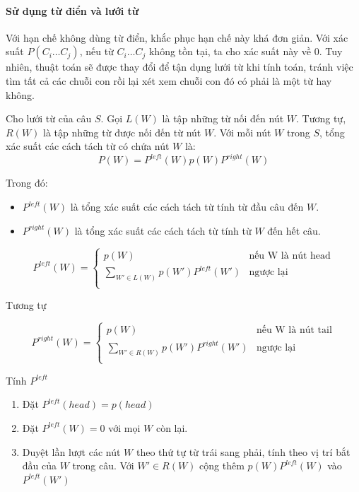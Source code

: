 \documentclass[a4paper,oneside,14pt]{extbook} %
\begin{document}
\paragraph{Sử dụng từ điển và lưới từ}

Với hạn chế không dùng từ điển, khắc phục hạn chế này khá đơn
giản. Với xác suất $P(C_i\ldots C_j)$, nếu từ $C_i\ldots C_j$ không
tồn tại, ta cho xác suất này về $0$. Tuy nhiên, thuật toán sẽ được
thay đổi để tận dụng lưới từ khi tính toán, tránh việc tìm tất cả các
chuỗi con rồi lại xét xem chuỗi con đó có phải là một từ hay không.

Cho lưới từ của câu $S$. Gọi $L(W)$ là tập những từ nối đến nút
$W$. Tương tự, $R(W)$ là tập những từ được nối đến từ nút $W$.
Với mỗi nút $W$ trong $S$, tổng xác suất các cách tách từ có chứa nút
$W$ là:
$$P(W)=P^{left}(W)p(W)P^{right}(W)$$

Trong đó:
\begin{itemize}
\item $P^{left}(W)$ là tổng xác suất các cách tách từ tính từ đầu câu
  đến $W$.
\item $P^{right}(W)$ là tổng xác suất các cách tách từ tính từ $W$ đến
  hết câu.
\end{itemize}

$$
P^{left}(W) = \left\{
    \begin{array}{ll}
      p(W)&\text{nếu W là nút head}\\
      \displaystyle\sum_{W' \in L(W)}p(W')P^{left}(W')&\text{ngược lại}\\
    \end{array}
  \right.
$$

Tương tự

$$
P^{right}(W) = \left\{
    \begin{array}{ll}
      p(W)&\text{nếu W là nút tail}\\
      \displaystyle\sum_{W' \in R(W)}p(W')P^{right}(W')&\text{ngược lại}\\
    \end{array}
  \right.
$$

\begin{algo}\caption{Tính $P^{left}$}
\label{algo:sc1:pleft}
\begin{enumerate}
\item Đặt $P^{left}(head) = p(head)$
\item Đặt $P^{left}(W) = 0$ với mọi $W$ còn lại.
\item Duyệt lần lượt các nút $W$ theo thứ tự từ trái sang phải, tính
  theo vị trí bắt đầu của $W$ trong câu. Với $W' \in R(W)$
  cộng thêm $p(W)P^{left}(W)$ vào $P^{left}(W')$
\end{enumerate}
\end{algo}
\end{document}

